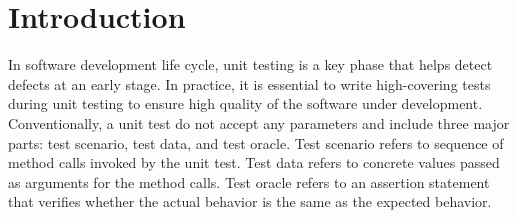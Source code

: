 \section{Introduction}
\label{sec:intro}

In software development life cycle, unit testing is a key phase that helps detect defects at an early stage. In practice, it is essential to write high-covering tests during unit testing to ensure high quality of the software under development. Conventionally, a unit test do not accept any parameters and include three major parts: test scenario, test data, and test oracle. Test scenario refers to sequence of method calls invoked by the unit test. Test data refers to concrete values passed as arguments for the method calls. Test oracle refers to an assertion statement that verifies whether the actual behavior is the same as the expected behavior. 


